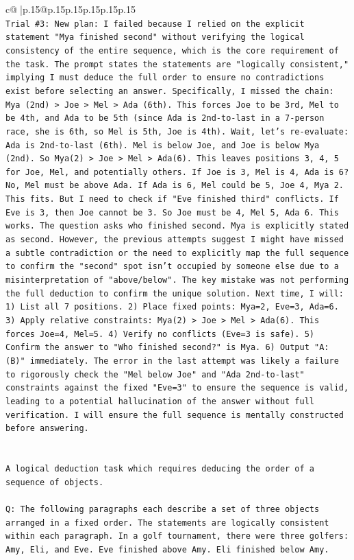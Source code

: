 \documentclass{article}
\begin{document}
{\begin{supertabular}{c@{$\;$}|p{.15\linewidth}@{}p{.15\linewidth}p{.15\linewidth}p{.15\linewidth}p{.15\linewidth}p{.15\linewidth}}
{{{\\ 
\texttt{Trial \#3: New plan: I failed because I relied on the explicit statement "Mya finished second" without verifying the logical consistency of the entire sequence, which is the core requirement of the task. The prompt states the statements are "logically consistent," implying I must deduce the full order to ensure no contradictions exist before selecting an answer. Specifically, I missed the chain: Mya (2nd) > Joe > Mel > Ada (6th). This forces Joe to be 3rd, Mel to be 4th, and Ada to be 5th (since Ada is 2nd{-}to{-}last in a 7{-}person race, she is 6th, so Mel is 5th, Joe is 4th). Wait, let's re{-}evaluate: Ada is 2nd{-}to{-}last (6th). Mel is below Joe, and Joe is below Mya (2nd). So Mya(2) > Joe > Mel > Ada(6). This leaves positions 3, 4, 5 for Joe, Mel, and potentially others. If Joe is 3, Mel is 4, Ada is 6? No, Mel must be above Ada. If Ada is 6, Mel could be 5, Joe 4, Mya 2. This fits. But I need to check if "Eve finished third" conflicts. If Eve is 3, then Joe cannot be 3. So Joe must be 4, Mel 5, Ada 6. This works. The question asks who finished second. Mya is explicitly stated as second. However, the previous attempts suggest I might have missed a subtle contradiction or the need to explicitly map the full sequence to confirm the "second" spot isn't occupied by someone else due to a misinterpretation of "above/below". The key mistake was not performing the full deduction to confirm the unique solution. Next time, I will: 1) List all 7 positions. 2) Place fixed points: Mya=2, Eve=3, Ada=6. 3) Apply relative constraints: Mya(2) > Joe > Mel > Ada(6). This forces Joe=4, Mel=5. 4) Verify no conflicts (Eve=3 is safe). 5) Confirm the answer to "Who finished second?" is Mya. 6) Output "A: (B)" immediately. The error in the last attempt was likely a failure to rigorously check the "Mel below Joe" and "Ada 2nd{-}to{-}last" constraints against the fixed "Eve=3" to ensure the sequence is valid, leading to a potential hallucination of the answer without full verification. I will ensure the full sequence is mentally constructed before answering.} \\
\\ 
\\ 
\texttt{A logical deduction task which requires deducing the order of a sequence of objects.} \\
\\ 
\texttt{Q: The following paragraphs each describe a set of three objects arranged in a fixed order. The statements are logically consistent within each paragraph. In a golf tournament, there were three golfers: Amy, Eli, and Eve. Eve finished above Amy. Eli finished below Amy.} \\
}}}
\end{supertabular}}
\end{document}
